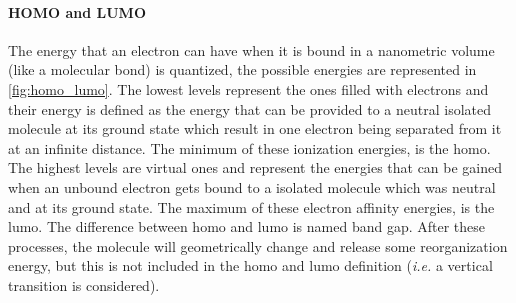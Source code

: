 		\paragraph{HOMO and LUMO}
		The energy that an electron can have when it is bound in a nanometric volume (like a molecular bond) is quantized, the possible energies are represented in \cref{fig:homo_lumo}.
		The lowest levels represent the ones filled with electrons and their energy is defined as the energy that can be provided to a neutral isolated molecule at its ground state which result in one electron being separated from it at an infinite distance.
		The minimum of these ionization energies, is the \gls{homo}.
		The highest levels are virtual ones and represent the energies that can be gained when an unbound electron gets bound to a isolated molecule which was neutral and at its ground state.
		The maximum of these electron affinity energies, is the \gls{lumo}.
		The difference between \gls{homo} and \gls{lumo} is named band gap.
		After these processes, the molecule will geometrically change and release some reorganization energy, but this is not included in the \gls{homo} and \gls{lumo} definition (\textsl{i.e.} a vertical transition is considered).
		

%		
%
%
%
%
%

